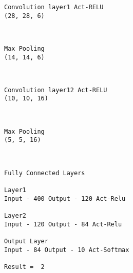 \documentclass[11pt]{article}
\begin{document}
    \begin{Verbatim}[commandchars=\\\{\}]
Convolution layer1 Act-RELU
(28, 28, 6)

    \end{Verbatim}

    \begin{center}
    \end{center}
    { \hspace*{\fill} \\}
    
    \begin{Verbatim}[commandchars=\\\{\}]
Max Pooling
(14, 14, 6)

    \end{Verbatim}

    \begin{center}
    \end{center}
    { \hspace*{\fill} \\}
    
    \begin{Verbatim}[commandchars=\\\{\}]
Convolution layer12 Act-RELU
(10, 10, 16)

    \end{Verbatim}

    \begin{center}
    \end{center}
    { \hspace*{\fill} \\}
    
    \begin{Verbatim}[commandchars=\\\{\}]
Max Pooling
(5, 5, 16)

    \end{Verbatim}

    \begin{center}
    \end{center}
    { \hspace*{\fill} \\}
    
    \begin{Verbatim}[commandchars=\\\{\}]
Fully Connected Layers

Layer1
Input - 400 Output - 120 Act-Relu

Layer2
Input - 120 Output - 84 Act-Relu

Output Layer
Input - 84 Output - 10 Act-Softmax

Result =  2

    \end{Verbatim}
\end{document}
